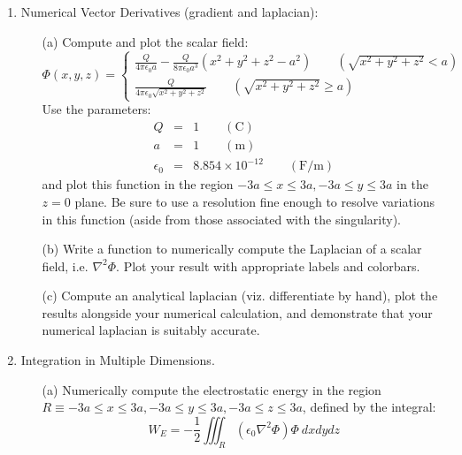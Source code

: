 \documentclass{article}
\begin{document}
\begin{enumerate}
\begin{itemize}
  \end{itemize} 
  \item Numerical Vector Derivatives (gradient and laplacian):
  \begin{itemize}
    \item[(a)]  Compute and plot the scalar field:
    \begin{equation}
      \Phi(x,y,z)= \left\{
      \begin{array}{c}
      \frac{Q}{4 \pi \epsilon_0 a} - \frac{Q}{8 \pi \epsilon_0 a^3} \left(x^2+y^2+z^2 - a^2 \right)
      \qquad \left( \sqrt{x^2+y^2+z^2} < a \right)
      \\
      \frac{Q}{4 \pi \epsilon_0 \sqrt{x^2+y^2+z^2}} \qquad \left( \sqrt{x^2+y^2+z^2} \ge a \right)
      \end{array}
      \right.      
    \end{equation}
    Use the parameters:
    \begin{eqnarray}
      Q &=& 1  \qquad \left( \mathrm{C} \right) \nonumber \\
      a &=& 1 \qquad (\mathrm{m}) \nonumber \\
      \epsilon_0 &=& 8.854 \times 10^{-12} \qquad (\mathrm{F/m}) \nonumber 
    \end{eqnarray}    
    and plot this function in the region $-3a \le x \le 3a, -3a \le y \le 3a$ in the $z=0$ plane. Be sure to use a resolution fine enough to resolve variations in this function (aside from those associated with the singularity).
    \item[(b)]  Write a function to numerically compute the Laplacian of a scalar field, i.e. $\nabla^2 \Phi$.  Plot your result with appropriate labels and colorbars.  
    \item[(c)]  Compute an analytical laplacian (viz. differentiate by hand), plot the results alongside your numerical calculation, and demonstrate that your numerical laplacian is suitably accurate.  
  \end{itemize}
  \item  Integration in Multiple Dimensions.  
  \begin{itemize}
    \item[(a)] Numerically compute the electrostatic energy in the region $R \equiv -3a \le x \le 3a, -3a \le y \le 3a, -3a \le z \le 3a$, defined by the integral:  
    \begin{equation}
      W_E = - \frac{1}{2} \iiint_R \left( \epsilon_0 \nabla^2 \Phi \right) \Phi ~dx dy dz
    \end{equation}

\end{itemize}
\end{enumerate}
\end{document}
